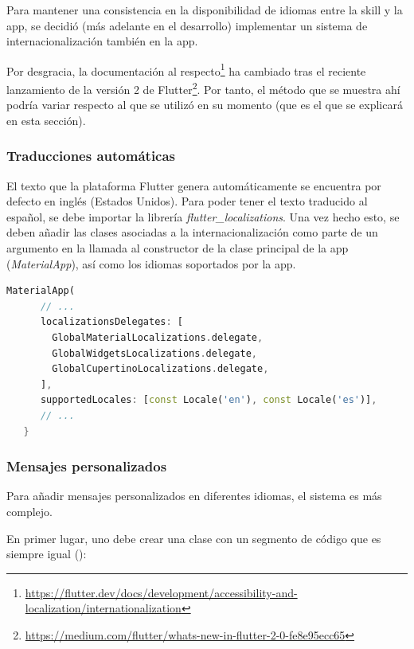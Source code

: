 \documentclass[11pt,spanish,listoffigures,listoftables,table,hyphens,dvipsnames]{tfgetsinf}
\newcommand{\fe}[1]{\foreign{english}{#1}}
\begin{document}
Para mantener una consistencia en la disponibilidad de idiomas entre la skill y la app, se decidió (más adelante en el desarrollo) implementar un sistema de internacionalización también en la app.

Por desgracia, la documentación al respecto\footnote{\url{https://flutter.dev/docs/development/accessibility-and-localization/internationalization}} ha cambiado tras el reciente lanzamiento de la versión 2 de Flutter\footnote{\url{https://medium.com/flutter/whats-new-in-flutter-2-0-fe8e95ecc65}}. Por tanto, el método que se muestra ahí podría variar respecto al que se utilizó en su momento (que es el que se explicará en esta sección).

\subsubsection{Traducciones automáticas}

El texto que la plataforma Flutter genera automáticamente se encuentra por defecto en inglés (Estados Unidos). Para poder tener el texto traducido al español, se debe importar la librería \emph{flutter\_localizations}. Una vez hecho esto, se deben añadir las clases asociadas a la internacionalización como parte de un argumento en la llamada al constructor de la clase principal de la app (\emph{MaterialApp}), así como los idiomas soportados por la app.

\begin{lstlisting}[language=Dart]
   MaterialApp(
      // ...
      localizationsDelegates: [
        GlobalMaterialLocalizations.delegate,
        GlobalWidgetsLocalizations.delegate,
        GlobalCupertinoLocalizations.delegate,
      ],
      supportedLocales: [const Locale('en'), const Locale('es')],
      // ...
   }
\end{lstlisting}

\subsubsection{Mensajes personalizados}

Para añadir mensajes personalizados en diferentes idiomas, el sistema es más complejo.

En primer lugar, uno debe crear una clase con un segmento de código que es siempre igual (\fe{boilerplate code}):
\end{document}

